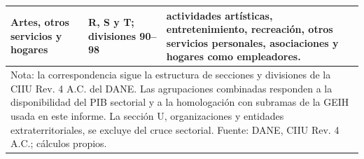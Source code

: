 \begin{longtable}{p{}p{}p{}}
Artes, otros servicios y hogares & R, S y T; divisiones 90--98 & actividades artísticas, entretenimiento, recreación, otros servicios personales, asociaciones y hogares como empleadores. \\
\bottomrule
\multicolumn{3}{p{0.90\textwidth}}{\footnotesize Nota: la correspondencia sigue la estructura de secciones y divisiones de la CIIU Rev. 4 A.C. del DANE. Las agrupaciones combinadas responden a la disponibilidad del PIB sectorial y a la homologación con subramas de la GEIH usada en este informe. La sección U, organizaciones y entidades extraterritoriales, se excluye del cruce sectorial. Fuente: DANE, CIIU Rev. 4 A.C.; cálculos propios.}\\
\end{longtable}